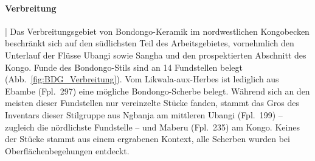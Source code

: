 \paragraph{Verbreitung}\hspace{-.5em}|\hspace{.5em}%
Das Verbreitungsgebiet von Bondongo-Keramik im nordwestlichen Kongobecken beschränkt sich auf den südlichsten Teil des Arbeitsgebietes, vornehmlich den Unterlauf der Flüsse \mbox{Ubangi} sowie \mbox{Sangha} und den prospektierten Abschnitt des Kongo. Funde des Bondongo-Stils sind an 14 Fundstellen belegt (Abb.~\ref{fig:BDG_Verbreitung}). Vom \mbox{Likwala}-\mbox{aux}-\mbox{Herbes} ist lediglich aus Ebambe (Fpl.~297) eine mögliche Bondongo-Scherbe belegt. Während sich an den meisten dieser Fundstellen nur vereinzelte Stücke fanden, stammt das Gros des Inventars dieser Stilgruppe aus \mbox{Ngbanja} am mittleren \mbox{Ubangi} (Fpl.~199) -- zugleich die nördlichste Fundstelle -- und Maberu (Fpl.~235) am Kongo. Keines der Stücke stammt aus einem ergrabenen Kontext, alle Scherben wurden bei Oberflächenbegehungen entdeckt.